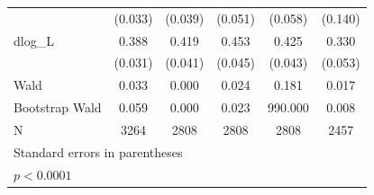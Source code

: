 \begin{table}[htbp]
\begin{tabular}{l*{5}{c}}
            &     (0.033)       &     (0.039)       &     (0.051)       &     (0.058)       &     (0.140)       \\
[1em]
dlog\_L      &       0.388\sym{*}&       0.419\sym{*}&       0.453\sym{*}&       0.425\sym{*}&       0.330\sym{*}\\
            &     (0.031)       &     (0.041)       &     (0.045)       &     (0.043)       &     (0.053)       \\
\hline
Wald        &       0.033       &       0.000       &       0.024       &       0.181       &       0.017       \\
Bootstrap Wald&       0.059       &       0.000       &       0.023       &     990.000       &       0.008       \\
N           &        3264       &        2808       &        2808       &        2808       &        2457       \\
\hline\hline
\multicolumn{6}{l}{\footnotesize Standard errors in parentheses}\\
\multicolumn{6}{l}{\footnotesize \sym{*} \(p<0.0001\)}\\
\end{tabular}
\end{table}
